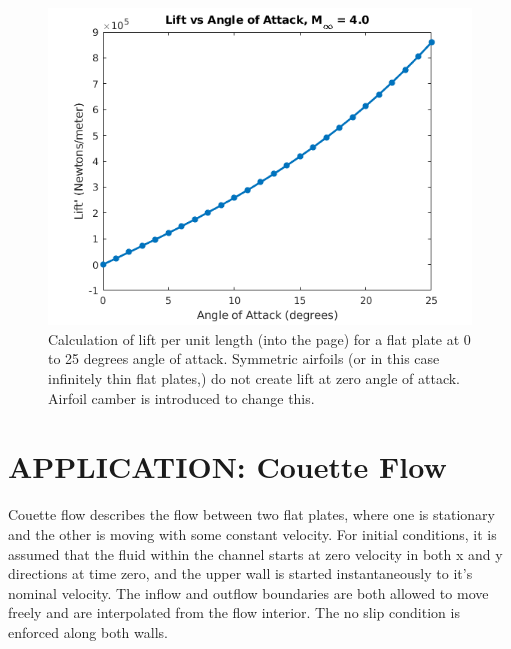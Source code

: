 \documentclass[10pt,a4paper]{article}
\begin{document}
\begin{figure}[!htb]
	\begin{center}
		\includegraphics[scale=0.7]{images/LiftVSAoA.png} 
		\caption{Calculation of lift per unit length (into the page) for a flat plate at 0 to 25 degrees angle of attack. Symmetric airfoils (or in this case infinitely thin flat plates,) do not create lift at zero angle of attack. Airfoil camber is introduced to change this.}
		\label{fig:TwoPlate_Lift}
	\end{center}
\end{figure}




\FloatBarrier








\section*{APPLICATION: Couette Flow}


Couette flow describes the flow between two flat plates, where one is stationary and the other is moving with some constant velocity. For initial conditions, it is assumed that the fluid within the channel starts at zero velocity in both x and y directions at time zero, and the upper wall is started instantaneously to it's nominal velocity. The inflow and outflow boundaries are both allowed to move freely and are interpolated from the flow interior. The no slip condition is enforced along both walls.\\
\end{document}

